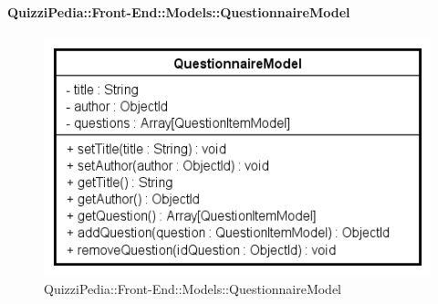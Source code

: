 \paragraph{QuizziPedia::Front-End::Models::QuestionnaireModel}
		
		\label{QuizziPedia::Front-End::Models::QuestionnaireModel}
		
		\begin{figure}[ht]
			\centering
			\includegraphics[scale=0.5,keepaspectratio]{UML/Classi/Front-End/QuizziPedia_Front-end_Models_QuestionnaireModel.png}
			\caption{QuizziPedia::Front-End::Models::QuestionnaireModel}
		\end{figure} \FloatBarrier
		
